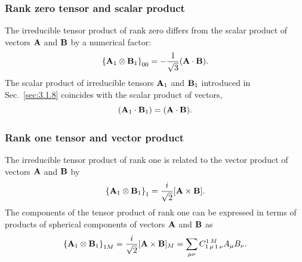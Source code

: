 \subsubsection{Rank zero tensor and scalar product}
 The irreducible tensor product of rank zero differs from the scalar product of vectors $\mathbf{A}$ and $\mathbf{B}$ by a numerical factor:
\begin{equation}
\left\{\mathbf{A}_{1} \otimes \mathbf{B}_{1}\right\}_{00}=-\frac{1}{\sqrt{3}}(\mathbf{A} \cdot \mathbf{B}). \label{eq:3:2:2}
\end{equation}
The scalar product of irreducible tensors $\mathbf{A}_{1}$ and $\mathbf{B}_{1}$ introduced in Sec.~\ref{sec:3.1.8} coincides with the scalar product of vectors,
\begin{equation}
\left(\mathbf{A}_{1} \cdot \mathbf{B}_{1}\right)=(\mathbf{A} \cdot \mathbf{B}) . \label{eq:3:2:3}
\end{equation}
\subsubsection{Rank one tensor and vector product}
 The irreducible tensor product of rank one is related to the vector product of vectors $\mathbf{A}$ and $\mathbf{B}$ by
\begin{equation}
\left\{\mathbf{A}_{1} \otimes \mathbf{B}_{1}\right\}_{1}=\frac{i}{\sqrt{2}}[\mathbf{A} \times \mathbf{B}] .\label{eq:3:2:4}
\end{equation}
The components of the tensor product of rank one can be expressed in terms of products of spherical components of vectors $\mathbf{A}$ and $\mathbf{B}$ as
\begin{equation}
\left\{\mathbf{A}_{1} \otimes \mathbf{B}_{1}\right\}_{1 M}=\frac{i}{\sqrt{2}}[\mathbf{A} \times \mathbf{B}]_{M}=\sum_{\mu \nu} C_{1\,\mu\,1\,\nu}^{1\,M} A_{\mu} B_{\nu} .\label{eq:3:2:5}
\end{equation}
